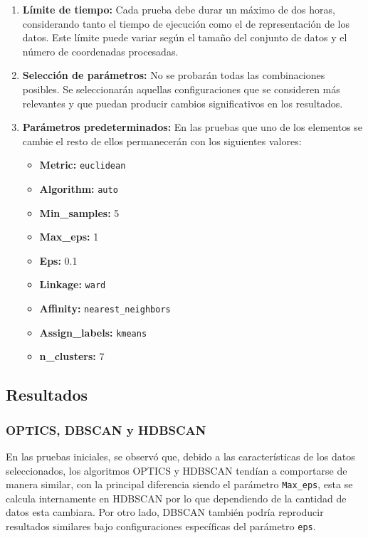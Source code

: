 \begin{enumerate}
    \item \textbf{Límite de tiempo:} Cada prueba debe durar un máximo de dos horas, considerando tanto el tiempo de ejecución como el de representación de los datos. Este límite puede variar según el tamaño del conjunto de datos y el número de coordenadas procesadas.
    \item \textbf{Selección de parámetros:} No se probarán todas las combinaciones posibles. Se seleccionarán aquellas configuraciones que se consideren más relevantes y que puedan producir cambios significativos en los resultados.
    \item \textbf{Parámetros predeterminados:} En las pruebas que uno de los elementos se cambie el resto de ellos permanecerán con los siguientes valores: 
    
    \begin{itemize}
    		\item \textbf{Metric:} \texttt{euclidean}
    		\item \textbf{Algorithm:} \texttt{auto}
    		\item \textbf{Min\_samples:} 5
   		\item \textbf{Max\_eps:} 1
    		\item \textbf{Eps:} 0.1
    		\item \textbf{Linkage:} \texttt{ward}
    		\item \textbf{Affinity:} \texttt{nearest\_neighbors}
    		\item \textbf{Assign\_labels:} \texttt{kmeans}
    		\item \textbf{n\_clusters:} 7
	\end{itemize}

\end{enumerate}

\subsection{Resultados}

\subsubsection{OPTICS, DBSCAN y HDBSCAN}

En las pruebas iniciales, se observó que, debido a las características de los datos seleccionados, los algoritmos OPTICS y HDBSCAN tendían a comportarse de manera similar, con la principal diferencia siendo el parámetro \texttt{Max\_eps}, esta se calcula internamente en HDBSCAN por lo que dependiendo de la cantidad de datos esta cambiara. Por otro lado, DBSCAN también podría reproducir resultados similares bajo configuraciones específicas del parámetro \texttt{eps}. 

